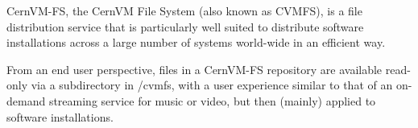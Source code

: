 CernVM-FS, the CernVM File System (also known as CVMFS), is a file distribution service that is particularly well suited to distribute software installations across a large number of systems world-wide in an efficient way.

From an end user perspective, files in a CernVM-FS repository are available read-only via a subdirectory in /cvmfs, with a user experience similar to that of an on-demand streaming service for music or video, but then (mainly) applied to software installations.
